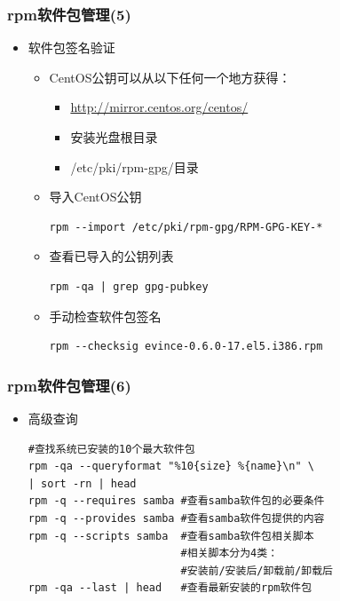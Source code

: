 \documentclass[xcolor=svgnames,presentation]{beamer}
\begin{document}
\begin{frame}[fragile]
\frametitle{rpm软件包管理(5)}
\label{sec-3-5}
\begin{itemize}

\item 软件包签名验证
\label{sec-3-5-1}%
\begin{itemize}

\item CentOS公钥可以从以下任何一个地方获得：
\label{sec-3-5-1-1}%
\begin{itemize}
\item \href{http://mirror.centos.org/centos/}{http://mirror.centos.org/centos/}
\item 安装光盘根目录
\item /etc/pki/rpm-gpg/目录
\end{itemize}

\item 导入CentOS公钥\\
\label{sec-3-5-1-2}%
\begin{verbatim}
rpm --import /etc/pki/rpm-gpg/RPM-GPG-KEY-*
\end{verbatim}

\item 查看已导入的公钥列表\\
\label{sec-3-5-1-3}%
\begin{verbatim}
rpm -qa | grep gpg-pubkey
\end{verbatim}

\item 手动检查软件包签名\\
\label{sec-3-5-1-4}%
\begin{verbatim}
rpm --checksig evince-0.6.0-17.el5.i386.rpm
\end{verbatim}
\end{itemize} %
\end{itemize} %
\end{frame}
\begin{frame}[fragile]
\frametitle{rpm软件包管理(6)}
\label{sec-3-6}
\begin{itemize}

\item 高级查询\\
\label{sec-3-6-1}%
\begin{verbatim}
#查找系统已安装的10个最大软件包
rpm -qa --queryformat "%10{size} %{name}\n" \
| sort -rn | head
rpm -q --requires samba #查看samba软件包的必要条件
rpm -q --provides samba #查看samba软件包提供的内容
rpm -q --scripts samba  #查看samba软件包相关脚本
                        #相关脚本分为4类：
                        #安装前/安装后/卸载前/卸载后
rpm -qa --last | head   #查看最新安装的rpm软件包
\end{verbatim}
\end{itemize} %
\end{frame}
\end{document}
